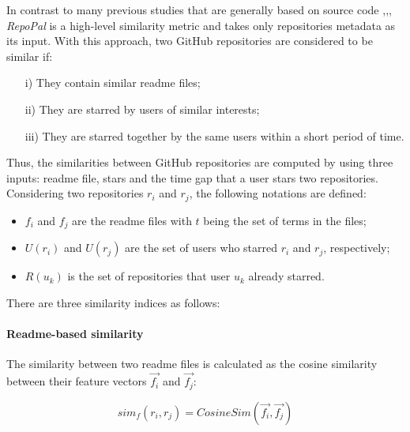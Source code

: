 In contrast to many previous studies that are generally based on source code \cite{10.1109/APSEC.2004.69},\cite{Liu:2006:GDS:1150402.1150522},\cite{McMillan:2012:DSS:2337223.2337267}, \textit{RepoPal}  \cite{10.1109/SANER.2017.7884605} is a high-level similarity metric and takes only repositories metadata as its input. With this approach, two GitHub repositories are considered to be similar if:

\begin{itemize}
	\item[i)] They contain similar readme files;
	\item[ii)] They are starred by users of similar interests;
	\item[iii)] They are starred together by the same users within a short period of time. 
\end{itemize}

Thus, the similarities between GitHub repositories are computed by using three inputs: readme file, stars and the time gap that a user stars two repositories. Considering two repositories $ r_{i} $ and $ r_{j} $, the following notations are defined: 

\begin{itemize}
	\item $ f_{i} $ and $ f_{j} $ are the readme files with $ t $ being the set of terms in the files; 
	\item $ U(r_{i}) $ and $ U(r_{j}) $ are the set of users who starred $ r_{i} $ and $ r_{j} $, respectively; 
	\item $ R(u_{k}) $ is the set of repositories that user $ u_{k} $ already starred.  
\end{itemize}

There are three similarity indices as follows:

\paragraph{Readme-based similarity} 

The similarity between two readme files is calculated as the cosine similarity between their feature vectors $\vec{f_{i}}$ and $\vec{f_{j}}$: 

\begin{equation}
sim_{f}(r_{i},r_{j})=CosineSim(\vec{f_{i}},\vec{f_{j}})
\end{equation}